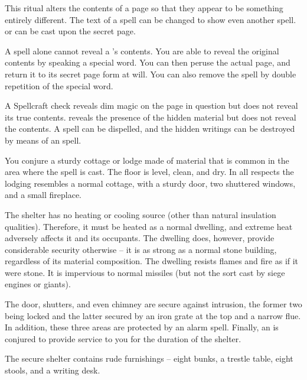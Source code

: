 \begin{spelleffect}
This ritual alters the contents of a page so that they appear to be something entirely different. The text of a spell can be changed to show even another spell.  or  can be cast upon the secret page.
\par A  spell alone cannot reveal a 's contents. You are able to reveal the original contents by speaking a special word. You can then peruse the actual page, and return it to its secret page form at will. You can also remove the spell by double repetition of the special word.
\end{spelleffect}
\begin{spellnotes}
A Spellcraft check reveals dim magic on the page in question but does not reveal its true contents.  reveals the presence of the hidden material but does not reveal the contents. A  spell can be dispelled, and the hidden writings can be destroyed by means of an  spell.
\end{spellnotes}

\spellrng{\rngclose}
\begin{spelleffect}
You conjure a sturdy cottage or lodge made of material that is common in the area where the spell is cast. The floor is level, clean, and dry. In all respects the lodging resembles a normal cottage, with a sturdy door, two shuttered windows, and a small fireplace.
\par The shelter has no heating or cooling source (other than natural insulation qualities). Therefore, it must be heated as a normal dwelling, and extreme heat adversely affects it and its occupants. The dwelling does, however, provide considerable security otherwise -- it is as strong as a normal stone building, regardless of its material composition. The dwelling resists flames and fire as if it were stone. It is impervious to normal missiles (but not the sort cast by siege engines or giants).
\par The door, shutters, and even chimney are secure against intrusion, the former two being locked and the latter secured by an iron grate at the top and a narrow flue. In addition, these three areas are protected by an alarm spell. Finally, an  is conjured to provide service to you for the duration of the shelter.
\par The secure shelter contains rude furnishings -- eight bunks, a trestle table, eight stools, and a writing desk.
\end{spelleffect}

